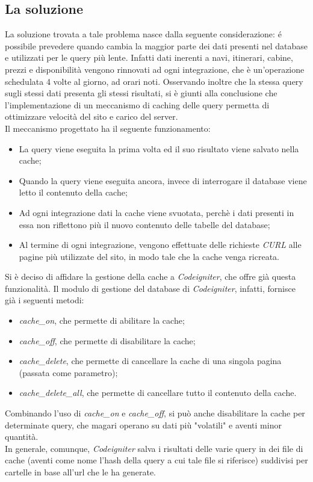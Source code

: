 \subsection{La soluzione}
La soluzione trovata a tale problema nasce dalla seguente considerazione: é possibile prevedere quando cambia la maggior parte dei dati presenti nel database e utilizzati per le query più lente. Infatti dati inerenti a navi, itinerari, cabine, prezzi e disponibilità vengono rinnovati ad ogni integrazione, che è un'operazione schedulata 4 volte al giorno, ad orari noti. Osservando inoltre che la stessa query sugli stessi dati presenta gli stessi risultati, si è giunti alla conclusione che l'implementazione di un meccanismo di caching delle query permetta di ottimizzare velocità del sito e carico del server.\\
Il meccanismo progettato ha il seguente funzionamento:
\begin{itemize}
	\item La query viene eseguita la prima volta ed il suo risultato viene salvato nella cache;
	\item Quando la query viene eseguita ancora, invece di interrogare il database viene letto il contenuto della cache;
	\item Ad ogni integrazione dati la cache viene svuotata, perchè i dati presenti in essa non riflettono più il nuovo contenuto delle tabelle del database;
	\item Al termine di ogni integrazione, vengono effettuate delle richieste \textit{CURL} alle pagine più utilizzate del sito, in modo tale che la cache venga ricreata.
\end{itemize}
Si è deciso di affidare la gestione della cache a \textit{Codeigniter}, che offre già questa funzionalità. Il modulo di gestione del database di \textit{Codeigniter}, infatti, fornisce già i seguenti metodi:
\begin{itemize}
	\item \textit{cache\_on}, che permette di abilitare la cache;
	\item \textit{cache\_off}, che permette di disabilitare la cache;
	\item \textit{cache\_delete}, che permette di cancellare la cache di una singola pagina (passata come parametro);
	\item \textit{cache\_delete\_all}, che permette di cancellare tutto il contenuto della cache.
\end{itemize}
Combinando l'uso di \textit{cache\_on} e \textit{cache\_off}, si può anche disabilitare la cache per determinate query, che magari operano su dati più "volatili" e aventi minor quantità. \\In generale, comunque, \textit{Codeigniter} salva i risultati delle varie query in dei file di cache (aventi come nome l'hash della query a cui tale file si riferisce) suddivisi per cartelle in base all'url che le ha generate.
